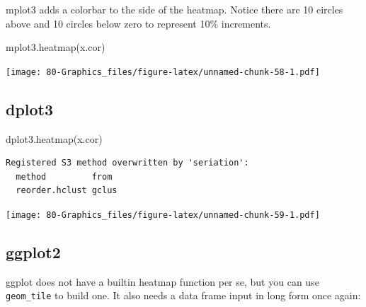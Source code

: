 \documentclass[
]{book}
\newenvironment{Shaded}{\begin{snugshade}}{\end{snugshade}}
\newcommand{\FunctionTok}[1]{\textcolor[rgb]{0.00,0.00,0.00}{#1}}
\newcommand{\NormalTok}[1]{#1}
\begin{document}
mplot3 adds a colorbar to the side of the heatmap. Notice there are 10 circles above and 10 circles below zero to represent 10\% increments.

\begin{Shaded}
\begin{Highlighting}[]
\FunctionTok{mplot3.heatmap}\NormalTok{(x.cor)}
\end{Highlighting}
\end{Shaded}

\texttt{[image: 80-Graphics\_files/figure-latex/unnamed-chunk-58-1.pdf]}

\hypertarget{dplot3-6}{%
\subsection{\texorpdfstring{\textbf{dplot3}}{dplot3}}\label{dplot3-6}}

\begin{Shaded}
\begin{Highlighting}[]
\FunctionTok{dplot3.heatmap}\NormalTok{(x.cor)}
\end{Highlighting}
\end{Shaded}

\begin{verbatim}
Registered S3 method overwritten by 'seriation':
  method         from 
  reorder.hclust gclus
\end{verbatim}

\texttt{[image: 80-Graphics\_files/figure-latex/unnamed-chunk-59-1.pdf]}

\hypertarget{ggplot2-7}{%
\subsection{\texorpdfstring{\textbf{ggplot2}}{ggplot2}}\label{ggplot2-7}}

ggplot does not have a builtin heatmap function per se, but you can use \texttt{geom\_tile} to build one. It also needs a data frame input in long form once again:
\end{document}
